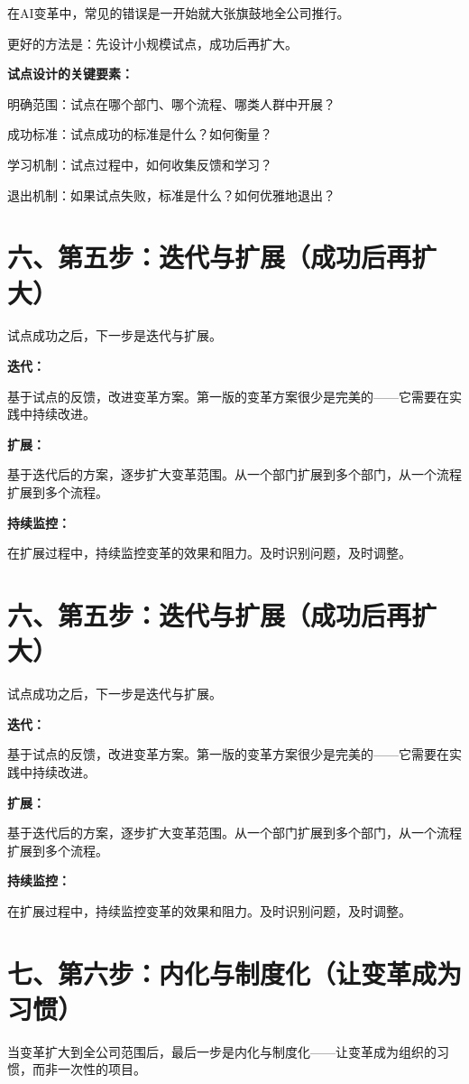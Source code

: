 在AI变革中，常见的错误是一开始就大张旗鼓地全公司推行。

更好的方法是：先设计小规模试点，成功后再扩大。

\textbf{试点设计的关键要素：}

明确范围：试点在哪个部门、哪个流程、哪类人群中开展？

成功标准：试点成功的标准是什么？如何衡量？

学习机制：试点过程中，如何收集反馈和学习？

退出机制：如果试点失败，标准是什么？如何优雅地退出？

\section{六、第五步：迭代与扩展（成功后再扩大）}


试点成功之后，下一步是迭代与扩展。

\textbf{迭代：}

基于试点的反馈，改进变革方案。第一版的变革方案很少是完美的——它需要在实践中持续改进。

\textbf{扩展：}

基于迭代后的方案，逐步扩大变革范围。从一个部门扩展到多个部门，从一个流程扩展到多个流程。

\textbf{持续监控：}

在扩展过程中，持续监控变革的效果和阻力。及时识别问题，及时调整。

\section{六、第五步：迭代与扩展（成功后再扩大）}


试点成功之后，下一步是迭代与扩展。

\textbf{迭代：}

基于试点的反馈，改进变革方案。第一版的变革方案很少是完美的——它需要在实践中持续改进。

\textbf{扩展：}

基于迭代后的方案，逐步扩大变革范围。从一个部门扩展到多个部门，从一个流程扩展到多个流程。

\textbf{持续监控：}

在扩展过程中，持续监控变革的效果和阻力。及时识别问题，及时调整。

\section{七、第六步：内化与制度化（让变革成为习惯）}


当变革扩大到全公司范围后，最后一步是内化与制度化——让变革成为组织的习惯，而非一次性的项目。

